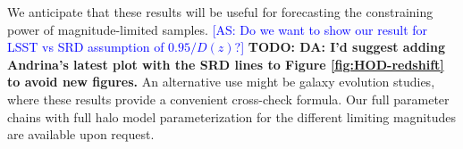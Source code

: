 \documentclass[a4paper,11pt]{article}
\newcommand{\todo}[1]{{\bf TODO: #1}}
\newcommand{\as}[1]{{\textcolor{blue}{[AS: #1]}}}
\begin{document}
    We anticipate that these results will be useful for forecasting the  constraining power of magnitude-limited samples. \as{Do we want to show our result for LSST vs SRD assumption of $0.95/D(z)$?} \todo{DA: I'd suggest adding Andrina's latest plot with the SRD lines to Figure \ref{fig:HOD-redshift} to avoid new figures.} An alternative use might be galaxy evolution studies, where these results provide a convenient cross-check formula. Our full parameter chains with full halo model parameterization for the different limiting magnitudes are available upon request. 
\end{document}
